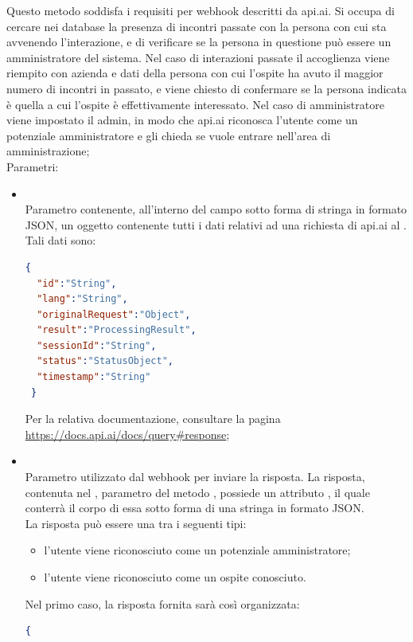 \begin{itemize}
\begin{itemize}
		Questo metodo soddisfa i requisiti per webhook descritti da api.ai. Si occupa di cercare nei database la presenza di incontri passate con la persona con cui sta avvenendo l'interazione, e di verificare se la persona in questione può essere un amministratore del sistema. Nel caso di interazioni passate il  accoglienza viene riempito con azienda e dati della persona con cui l'ospite ha avuto il maggior numero di incontri in passato, e viene chiesto di confermare se la persona indicata è quella a cui l'ospite è effettivamente interessato. Nel caso di amministratore viene impostato il  admin, in modo che api.ai riconosca l'utente come un potenziale amministratore e gli chieda se vuole entrare nell'area di amministrazione;\\
		Parametri:
		\begin{itemize}
			\item {} \\
			Parametro contenente, all'interno del campo  sotto forma di stringa in formato JSON, un oggetto contenente tutti i dati relativi ad una richiesta di api.ai al . Tali dati sono:
\begin{lstlisting}[language=json,firstnumber=1]
{
  "id":"String",
  "lang":"String",
  "originalRequest":"Object",
  "result":"ProcessingResult",
  "sessionId":"String",
  "status":"StatusObject",
  "timestamp":"String"
 }
\end{lstlisting}
Per la relativa documentazione, consultare la pagina \url{https://docs.api.ai/docs/query#response};
			\item {} \\
			Parametro utilizzato dal webhook per inviare la risposta. La risposta, contenuta nel , parametro del metodo , possiede un attributo , il quale conterrà il corpo di essa sotto forma di una stringa in formato JSON. \\
La risposta può essere una tra i seguenti tipi:
\begin{itemize}
    \item l'utente viene riconosciuto come un potenziale amministratore;
    \item l'utente viene riconosciuto come un ospite conosciuto.
\end{itemize}
Nel primo caso, la risposta fornita sarà così organizzata:
\begin{lstlisting}[language=json,firstnumber=1]
{

\end{lstlisting}
\end{itemize}
\end{itemize}
\end{itemize}
